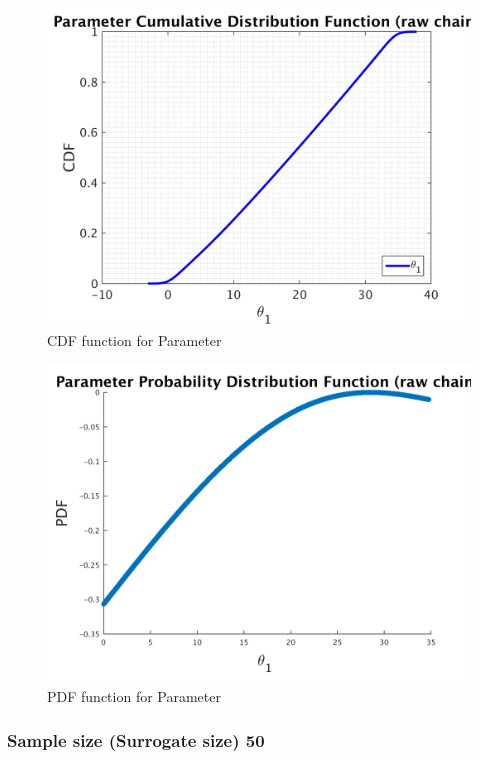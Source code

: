 \begin{figure}[h!]
  
  \centering
   \includegraphics[scale=0.75]{output_20/simple_ip_cdf_raw}
   \caption{CDF function for Parameter }
\end{figure}



\begin{figure}[h!]
  
  \centering
   \includegraphics[scale=0.75]{output_20/ip_logLike_unified}
   \caption{PDF function for Parameter }
\end{figure}


\subsubsection{Sample size (Surrogate size) 50 }

